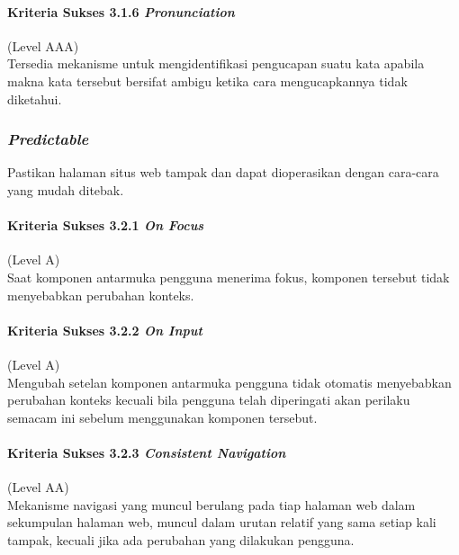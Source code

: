 \documentclass[a4paper,twoside]{article}
\begin{document}
\begin{enumerate}
		\paragraph{Kriteria Sukses 3.1.6 \textit{Pronunciation}}
		\label{sec:kriteria_sukses_3.1.6}
		(Level AAA)\\

		Tersedia mekanisme untuk mengidentifikasi pengucapan suatu kata apabila makna kata tersebut bersifat ambigu ketika cara mengucapkannya tidak diketahui.

		\subsubsection*{\textit{Predictable}}
		\label{sec:predictable}
		Pastikan halaman situs web tampak dan dapat dioperasikan dengan cara-cara yang mudah ditebak.

		\paragraph{Kriteria Sukses 3.2.1 \textit{On Focus}}
		\label{sec:kriteria_sukses_3.2.1}
		(Level A)\\

		Saat komponen antarmuka pengguna menerima fokus, komponen tersebut tidak menyebabkan perubahan konteks.

		\paragraph{Kriteria Sukses 3.2.2 \textit{On Input}}
		\label{sec:kriteria_sukses_3.2.2}
		(Level A)\\

		Mengubah setelan komponen antarmuka pengguna tidak otomatis menyebabkan perubahan konteks kecuali bila pengguna telah diperingati akan perilaku semacam ini sebelum menggunakan komponen tersebut.

		\paragraph{Kriteria Sukses 3.2.3 \textit{Consistent Navigation}}
		\label{sec:kriteria_sukses_3.2.3}
		(Level AA)\\

		Mekanisme navigasi yang muncul berulang pada tiap halaman web dalam sekumpulan halaman web, muncul dalam urutan relatif yang sama setiap kali tampak, kecuali jika ada perubahan yang dilakukan pengguna.


\end{enumerate}
\end{document}
